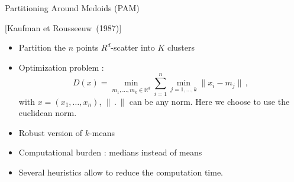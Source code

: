\documentclass[xcolor=dvipsnames, smaller]{beamer}
\begin{document}
\begin{frame}{Partitioning Around Medoids (PAM)
      \begin{scriptsize} \hfill [Kaufman et Rousseeuw~(1987)] \end{scriptsize}}

\begin{itemize}
 \item Partition the $n$ points $R^d$-scatter into $K$ clusters
 \item Optimization problem :
 \[ D(x) = \min_{m_1,\dots,m_k \in \mathbb{R}^d} \sum_{i=1}^{n} \min_{j=1,\dots,k} \| x_i - m_j \| \, ,\]
with $x = (x_1,\dots,x_n)$, $\|\,.\,\|$ can be any norm. Here we choose to use the euclidean norm. 
  \item Robust version of $k$-means
  \item Computational burden : medians instead of means
  \item Several heuristics allow to reduce the computation time.
\end{itemize}
\end{frame}

\end{document}
